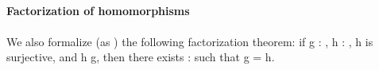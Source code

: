 \begin{code}
\<%
\\
%
\>[2]\AgdaSpace{}%
\AgdaSpace{}%
\AgdaSpace{}%
\AgdaSpace{}%
\AgdaSymbol{=}\AgdaSpace{}%
\AgdaSpace{}%
\AgdaSpace{}%
\AgdaSpace{}%
\AgdaSpace{}%
\AgdaSpace{}%
\<%
\\
%
\>[2]\AgdaSpace{}%
\AgdaSymbol{:}\AgdaSpace{}%
\AgdaSpace{}%
\AgdaSpace{}%
\AgdaSymbol{(}\AgdaSpace{}%
\AgdaSymbol{)}\AgdaSpace{}%
\<%
\\
%
\>[2]\AgdaSpace{}%
\AgdaSpace{}%
\AgdaSymbol{=}\AgdaSpace{}%
\AgdaSpace{}%
\AgdaSpace{}%
\AgdaSpace{}%
\AgdaSpace{}%
\AgdaSpace{}%
\AgdaSpace{}%
\AgdaSpace{}%
\<%
\end{code}

\paragraph*{Factorization of homomorphisms}
\fi      %
We also formalize (as ) the following factorization theorem: if \ab g : 
 , \ab h :   , \ab h is surjective, and  \ab h
  \ab g, then there exists  :    such that \ab g
=   \ab h.
\ifshort\else


